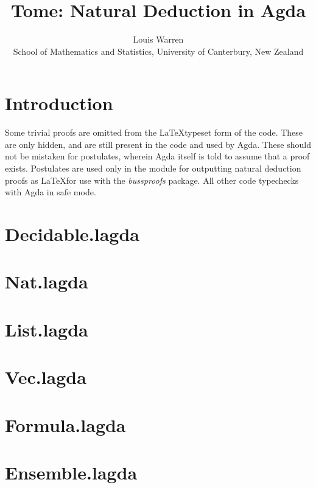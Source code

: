 \documentclass{article}
\begin{document}
\title{Tome: Natural Deduction in Agda}
\author{
Louis Warren \\
School of Mathematics and Statistics, University of Canterbury, New Zealand
}
\date{}
\maketitle

\tableofcontents

\section{Introduction}
Some trivial proofs are omitted from the \LaTeX typeset form of the code. These
are only hidden, and are still present in the code and used by Agda. These
should not be mistaken for postulates, wherein Agda itself is told to assume
that a proof exists. Postulates are used only in the module for outputting
natural deduction proofs as \LaTeX for use with the \emph{bussproofs} package.
All other code typechecks with Agda in safe mode.

\section{Decidable.lagda}


\section{Nat.lagda}


\section{List.lagda}


\section{Vec.lagda}


\section{Formula.lagda}


\section{Ensemble.lagda}

\end{document}
